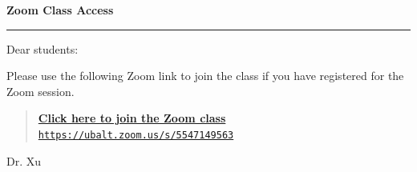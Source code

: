 \documentclass[12pt]{article}
\newcommand{\zoomlink}{https://ubalt.zoom.us/s/5547149563}
\begin{document}
\begin{center}
	{\large\sffamily\bfseries Zoom Class Access}\par
	\vspace{0.65em}
	{\color{LinkBlue}\rule{0.28\textwidth}{0.8pt}}
\end{center}
\vspace{1em}

Dear students:

Please use the following Zoom link to join the class if you have registered for the Zoom session.

\begin{quote}
	\href{\zoomlink}{\textbf{Click here to join the Zoom class}}\\[0.45em]
	\href{\zoomlink}{\texttt{\zoomlink}}
\end{quote}

\vspace{1em}
Dr. Xu
\end{document}
